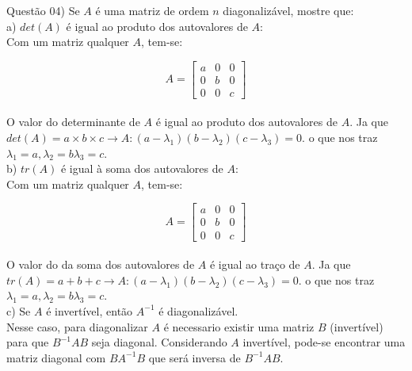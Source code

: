 
\noindent \textcolor{COLOR1}{Questão 04)} Se $A$ é uma matriz de ordem $n$ diagonalizável, mostre que:
\\

a)  $det(A)$ é igual ao produto dos autovalores de $A$:
\\

Com um matriz qualquer $A$, tem-se:

\[
    A=\begin{bmatrix}
        a & 0 & 0 \\
        0 & b & 0 \\
        0 & 0 & c
    \end{bmatrix}
\]
\\

O valor do \textcolor{COLOR2}{determinante de $A$ é igual ao produto dos autovalores de $A$}. Ja que $det(A)=a\times b\times c\to A:(a-\lambda_1)(b-\lambda_2)(c-\lambda_3)=0$. o que nos traz $\lambda_1 = a,\lambda_2=b\lambda_3=c$.\\

b) $tr(A)$ é igual à soma dos autovalores de $A$:\\

Com um matriz qualquer $A$, tem-se:

\[
    A=\begin{bmatrix}
        a & 0 & 0 \\
        0 & b & 0 \\
        0 & 0 & c
    \end{bmatrix}
\]
\\

O valor do \textcolor{COLOR2}{da soma dos autovalores de $A$ é igual ao traço de $A$}. Ja que $tr(A)=a+ b+ c\to A:(a-\lambda_1)(b-\lambda_2)(c-\lambda_3)=0$. o que nos traz $\lambda_1 = a,\lambda_2=b\lambda_3=c$.\\

c) Se $A$ é invertível, então $A^{-1}$ é diagonalizável.\\

Nesse caso, para diagonalizar $A$ é necessario existir uma matriz $B$ (invertível) para que $B^{-1}AB$ seja diagonal. Considerando $A$ invertível, pode-se encontrar uma matriz diagonal com $BA^{-1}B$ que será inversa de $B^{-1}AB$.\\